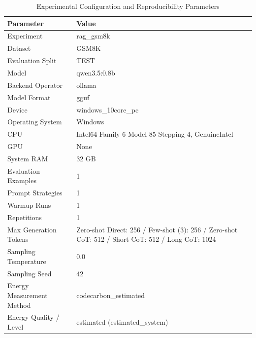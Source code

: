 \begin{table}
\caption{Experimental Configuration and Reproducibility Parameters}
\label{tab:experimental_configuration}
\begin{tabular}{ll}
\toprule
Parameter & Value \\
\midrule
Experiment & rag\_gsm8k \\
Dataset & GSM8K \\
Evaluation Split & TEST \\
Model & qwen3.5:0.8b \\
Backend Operator & ollama \\
Model Format & gguf \\
Device & windows\_10core\_pc \\
Operating System & Windows \\
CPU & Intel64 Family 6 Model 85 Stepping 4, GenuineIntel \\
GPU & None \\
System RAM & 32 GB \\
Evaluation Examples & 1 \\
Prompt Strategies & 1 \\
Warmup Runs & 1 \\
Repetitions & 1 \\
Max Generation Tokens & Zero-shot Direct: 256 / Few-shot (3): 256 / Zero-shot CoT: 512 / Short CoT: 512 / Long CoT: 1024 \\
Sampling Temperature & 0.0 \\
Sampling Seed & 42 \\
Energy Measurement Method & codecarbon\_estimated \\
Energy Quality / Level & estimated (estimated\_system) \\
\bottomrule
\end{tabular}
\end{table}
